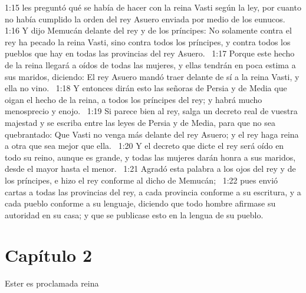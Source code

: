 1:15 les preguntó qué se había de hacer con la reina Vasti según la ley, por cuanto no había cumplido la orden del rey Asuero enviada por medio de los eunucos.  
1:16 Y dijo Memucán delante del rey y de los príncipes: No solamente contra el rey ha pecado la reina Vasti, sino contra todos los príncipes, y contra todos los pueblos que hay en todas las provincias del rey Asuero.  
1:17 Porque este hecho de la reina llegará a oídos de todas las mujeres, y ellas tendrán en poca estima a sus maridos, diciendo: El rey Asuero mandó traer delante de sí a la reina Vasti, y ella no vino.  
1:18 Y entonces dirán esto las señoras de Persia y de Media que oigan el hecho de la reina, a todos los príncipes del rey; y habrá mucho menosprecio y enojo.  
1:19 Si parece bien al rey, salga un decreto real de vuestra majestad y se escriba entre las leyes de Persia y de Media, para que no sea quebrantado: Que Vasti no venga más delante del rey Asuero; y el rey haga reina a otra que sea mejor que ella.  
1:20 Y el decreto que dicte el rey será oído en todo su reino, aunque es grande, y todas las mujeres darán honra a sus maridos, desde el mayor hasta el menor.  
1:21 Agradó esta palabra a los ojos del rey y de los príncipes, e hizo el rey conforme al dicho de Memucán;  
1:22 pues envió cartas a todas las provincias del rey, a cada provincia conforme a su escritura, y a cada pueblo conforme a su lenguaje, diciendo que todo hombre afirmase su autoridad en su casa; y que se publicase esto en la lengua de su pueblo.  
\section*{Capítulo 2}
Ester es proclamada reina  

